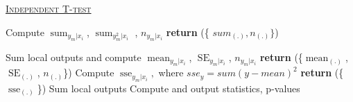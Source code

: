 \documentclass[10pt]{article}
\DeclareMathOperator*{\summ}{sum}
\DeclareMathOperator*{\mean}{mean}
\DeclareMathOperator*{\SE}{SE}
\DeclareMathOperator*{\sse}{sse}
\begin{document}
\begin{algorithm}
	\caption{\underline{\textsc{Independent T-test }}}
	\label{naivebayes_train}
	\begin{algorithmic}[1] %
		 
				\State Compute  $\summ_{y_m|x_i}$,  $\summ_{y^2_m|x_i}$ , $n_{y_m|x_i}$
		   \EndFor
		\State \textbf{return} (\{ $sum_{(.)}, n_{(.)}\}$)
		\EndProcedure
		
				\State Sum local outputs and compute $\mean_{y_m|x_i}$, $\SE_{y_m|x_i}$,  $n_{y_m|x_i}$   
			\EndFor
			\State \textbf{return} (\{$\mean_{(.)}$, $\SE_{(.)}$,  $n_{(.)}$\}) 
		\EndProcedure
		 
			\State Compute $\sse_{y_m|x_i}, $ where $sse_y =sum(y-mean)^2$
			\EndFor
			\State \textbf{return} (\{$\sse_{(.)}$\})
		\EndProcedure
			\State Sum local outputs 
			\State Compute and output statistics, p-values
			\EndFor
		\EndProcedure
	\end{algorithmic}
\end{algorithm}
\end{document}
